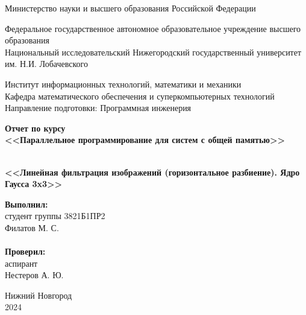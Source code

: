 \documentclass{report}
\begin{document}
\begin{titlepage}

\begin{center}
Министерство науки и высшего образования Российской Федерации
\end{center}

\begin{center}
Федеральное государственное автономное образовательное учреждение высшего образования \\
Национальный исследовательский Нижегородский государственный университет \newline им. Н.И. Лобачевского
\end{center}

\begin{center}
Институт информационных технологий, математики и механики \\
Кафедра математического обеспечения и суперкомпьютерных технологий \\
Направление подготовки: Программная инженерия
\end{center}

\begin{center}
\textbf{Отчет по курсу \\
\vspace{0.5em}
<<Параллельное программирование для систем с общей памятью>>} \\
\end{center}

\vspace{4em}

\begin{center}
\textbf{ \\
\vspace{0.5em}
<<Линейная фильтрация изображений (горизонтальное разбиение). Ядро Гаусса 3x3>>} \\
\end{center}

\vspace{4em}

\newbox{\lbox}
\newlength{\maxl}
\setlength{\maxl}{\wd\lbox}
\hfill\parbox{7cm}{
\hspace*{5cm}\hspace*{-5cm}\textbf{Выполнил:} \\ студент группы 3821Б1ПР2\\Филатов М. С.\\
\\
\hspace*{5cm}\hspace*{-5cm}\textbf{Проверил:}\\ аспирант\\Нестеров А. Ю.\\
}
\vspace{\fill}

\begin{center} Нижний Новгород \\ 2024 \end{center}

\end{titlepage}
\end{document}
